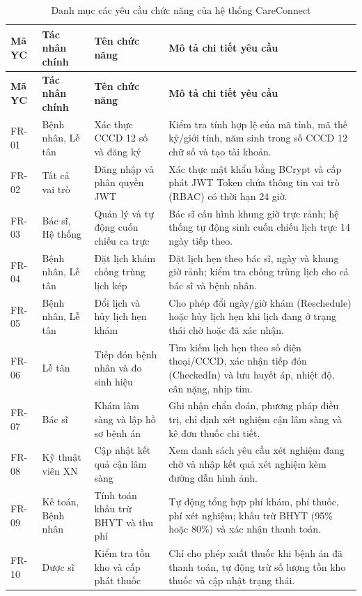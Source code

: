 \begin{longtable}{|p{1.6cm}|p{3.0cm}|p{4.2cm}|p{5.2cm}|}
\caption{Danh mục các yêu cầu chức năng của hệ thống CareConnect}
\label{tab:fr_list} \\
\hline
\textbf{Mã YC} & \textbf{Tác nhân chính} & \textbf{Tên chức năng} & \textbf{Mô tả chi tiết yêu cầu} \\
\hline
\endfirsthead
\hline
\textbf{Mã YC} & \textbf{Tác nhân chính} & \textbf{Tên chức năng} & \textbf{Mô tả chi tiết yêu cầu} \\
\hline
\endhead
FR-01 & Bệnh nhân, Lễ tân & Xác thực CCCD 12 số và đăng ký & Kiểm tra tính hợp lệ của mã tỉnh, mã thế kỷ/giới tính, năm sinh trong số CCCD 12 chữ số và tạo tài khoản. \\
\hline
FR-02 & Tất cả vai trò & Đăng nhập và phân quyền JWT & Xác thực mật khẩu bằng BCrypt và cấp phát JWT Token chứa thông tin vai trò (RBAC) có thời hạn 24 giờ. \\
\hline
FR-03 & Bác sĩ, Hệ thống & Quản lý và tự động cuốn chiếu ca trực & Bác sĩ cấu hình khung giờ trực rảnh; hệ thống tự động sinh cuốn chiếu lịch trực 14 ngày tiếp theo. \\
\hline
FR-04 & Bệnh nhân, Lễ tân & Đặt lịch khám chống trùng lịch kép & Đặt lịch hẹn theo bác sĩ, ngày và khung giờ rảnh; kiểm tra chống trùng lịch cho cả bác sĩ và bệnh nhân. \\
\hline
FR-05 & Bệnh nhân, Lễ tân & Đổi lịch và hủy lịch hẹn khám & Cho phép đổi ngày/giờ khám (Reschedule) hoặc hủy lịch hẹn khi lịch đang ở trạng thái chờ hoặc đã xác nhận. \\
\hline
FR-06 & Lễ tân & Tiếp đón bệnh nhân và đo sinh hiệu & Tìm kiếm lịch hẹn theo số điện thoại/CCCD, xác nhận tiếp đón (CheckedIn) và lưu huyết áp, nhiệt độ, cân nặng, nhịp tim. \\
\hline
FR-07 & Bác sĩ & Khám lâm sàng và lập hồ sơ bệnh án & Ghi nhận chẩn đoán, phương pháp điều trị, chỉ định xét nghiệm cận lâm sàng và kê đơn thuốc chi tiết. \\
\hline
FR-08 & Kỹ thuật viên XN & Cập nhật kết quả cận lâm sàng & Xem danh sách yêu cầu xét nghiệm đang chờ và nhập kết quả xét nghiệm kèm đường dẫn hình ảnh. \\
\hline
FR-09 & Kế toán, Bệnh nhân & Tính toán khấu trừ BHYT và thu phí & Tự động tổng hợp phí khám, phí thuốc, phí xét nghiệm; khấu trừ BHYT (95\% hoặc 80\%) và xác nhận thanh toán. \\
\hline
FR-10 & Dược sĩ & Kiểm tra tồn kho và cấp phát thuốc & Chỉ cho phép xuất thuốc khi bệnh án đã thanh toán, tự động trừ số lượng tồn kho thuốc và cập nhật trạng thái. \\

\end{longtable}
